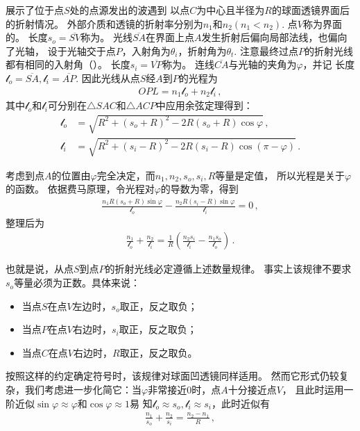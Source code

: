 展示了位于点$S$处的点源发出的波遇到
以点$C$为中心且半径为$R$的球面透镜界面后的折射情况。
外部介质和透镜的折射率分别为$n_1$和$n_2 (n_1<n_2)$.
点$V$称为界面的。
长度$s_o=\overline{SV}$称为。
光线$\overline{SA}$在界面上点$A$发生折射后偏向局部法线，也偏向了光轴，
设于光轴交于点$P$，入射角为$\theta_i$，折射角为$\theta_t$.
注意最终过点$P$的折射光线都有相同的入射角（）。
长度$s_i=\overline{VP}$称为。
连线$\overline{CA}$与光轴的夹角为$\varphi$，并记
长度$\mathcal{l}_o=\overline{SA}, \mathcal{l}_i=\overline{AP}$.
因此光线从点$S$经$A$到$P$的光程为
\begin{align}
    OPL=n_1\mathcal{l}_o+n_2\mathcal{l}_i\, ,
\end{align}
其中$\mathcal{l}_o$和$\mathcal{l}_i$可分别在$\triangle SAC$和$\triangle ACP$中应用余弦定理得到：
\begin{align}
    \mathcal{l}_o & =\sqrt{R^2+(s_o+R)^2-2R(s_o+R)\cos\varphi}\, ,       \\
    \mathcal{l}_i & =\sqrt{R^2+(s_i-R)^2-2R(s_i-R)\cos(\pi-\varphi)}\, .
\end{align}

考虑到点$A$的位置由$\varphi$完全决定，而$n_1, n_2, s_o, s_i, R$等量是定值，
所以光程是关于$\varphi$的函数。
依据费马原理，令光程对$\varphi$的导数为零，得到
\begin{align}
    \frac{n_1R(s_o+R)\sin\varphi}{\mathcal{l}_o}-\frac{n_2R(s_i-R)\sin\varphi}{\mathcal{l}_i}=0\, ,
\end{align}
整理后为
\begin{align}
    \frac{n_1}{\mathcal{l}_o}+\frac{n_2}{\mathcal{l}_i}=\frac{1}{R}\left(\frac{n_2s_i}{\mathcal{l}_i}-\frac{n_1s_o}{\mathcal{l}_o}\right)\, .
\end{align}

也就是说，从点$S$到点$P$的折射光线必定遵循上述数量规律。
事实上该规律不要求$s_o$等量必须为正数。具体来说：
\begin{itemize}
    \item 当点$S$在点$V$左边时，$s_o$取正，反之取负；
    \item 当点$P$在点$V$右边时，$s_i$取正，反之取负；
    \item 当点$C$在点$V$右边时，$R$取正，反之取负。
\end{itemize}

按照这样的约定确定符号时，该规律对球面凹透镜同样适用。
然而它形式仍较复杂，我们考虑进一步化简它：当$\varphi$非常接近0时，点$A$十分接近点$V$，
且此时运用一阶近似$\sin\varphi\approx\varphi$和$\cos\varphi\approx 1$易
知$\mathcal{l}_o\approx s_o, \mathcal{l}_i\approx s_i$，此时近似有
\begin{align}\label{eq:6.24}
    \frac{n_1}{s_o}+\frac{n_2}{s_i}=\frac{n_2-n_1}{R}\, ,
\end{align}

